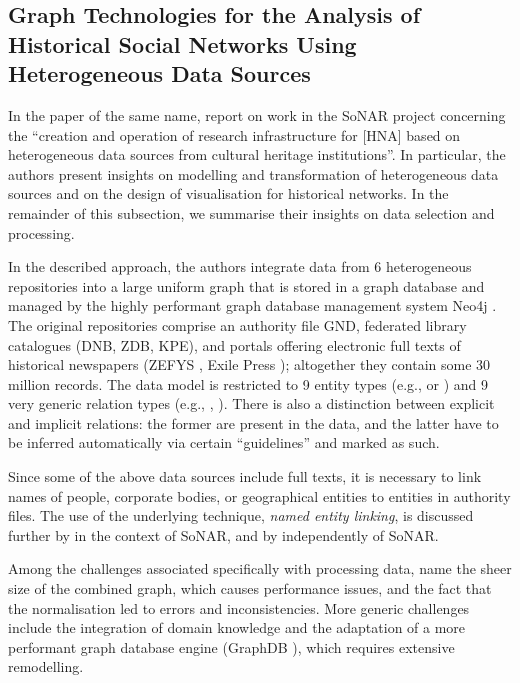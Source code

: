 \subsection{Graph Technologies for the Analysis of Historical Social Networks Using Heterogeneous Data Sources}

In the paper of the same name, \textcite{Menzel2020} report on
work in the \gls{SoNAR} project concerning the 
\enquote{creation and operation of research infrastructure
for [\gls{HNA}] based on heterogeneous data sources from cultural heritage institutions}.
In particular, the authors present insights on modelling and transformation
of heterogeneous data sources and on the design of visualisation for historical networks.
In the remainder of this subsection,
we summarise their insights on data selection and processing.

In the described approach, the authors integrate data from 6 heterogeneous repositories
into a large uniform graph that is stored in a graph database
and managed by the highly performant graph database management system Neo4j \autocite{Neo4j}.
The original repositories comprise an authority file \gls{GND},
federated library catalogues (\gls{DNB}, \gls{ZDB}, \gls{KPE}), %
and portals offering electronic full texts of historical newspapers 
%
(\gls{ZEFYS} \autocite{ZEFYS}, Exile Press \autocite{ExilePress});
altogether they contain some 30 million records.
The data model is restricted to 9 entity types (e.g.,  or )
and 9 very generic relation types (e.g., , ).
There is also a distinction between explicit and implicit relations:
the former are present in the data, and the latter have to be inferred automatically via
certain \enquote{guidelines} and marked as such.

Since some of the above data sources include full texts,
it is necessary to link names of people, corporate bodies, or geographical entities
to entities in authority files. The use of the underlying technique,
\emph{named entity linking}, is discussed further by \textcite{Menzel2021}
in the context of \gls{SoNAR},
and by \textcite{Meiners2022} independently of \gls{SoNAR}.

Among the challenges associated specifically with processing data,
\textcite{Menzel2020} name
the sheer size of the combined graph, which causes performance issues,
and the fact that the normalisation led to errors and inconsistencies.
More generic challenges include the integration of domain knowledge
and the adaptation of a more performant graph database engine (GraphDB \autocite{GraphDB}),
which requires extensive remodelling.

